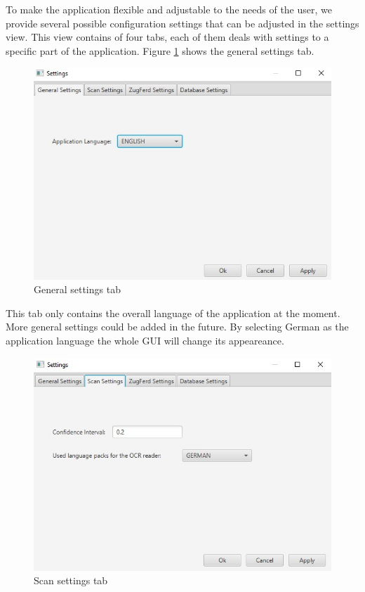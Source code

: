 To make the application flexible and adjustable to the needs of the user, we provide several possible configuration settings that can be adjusted in the settings view. This view contains of four tabs, each of them deals with settings to a specific part of the application.
Figure \ref{settings_General} shows the general settings tab. 

\begin{figure}[ht!]
\centering
\includegraphics[scale=0.6]{Images/GUI/settings_General.jpg}
\caption{General settings tab \label{settings_General}}
\end{figure}

This tab only contains the overall language of the application at the moment. More general settings could be added in the future. By selecting German as the application language the whole GUI will change its appeareance.

\begin{figure}[ht!]
\centering
\includegraphics[scale=0.6]{Images/GUI/settings_Scan.jpg}
\caption{Scan settings tab \label{settings_Scan}}
\end{figure}

